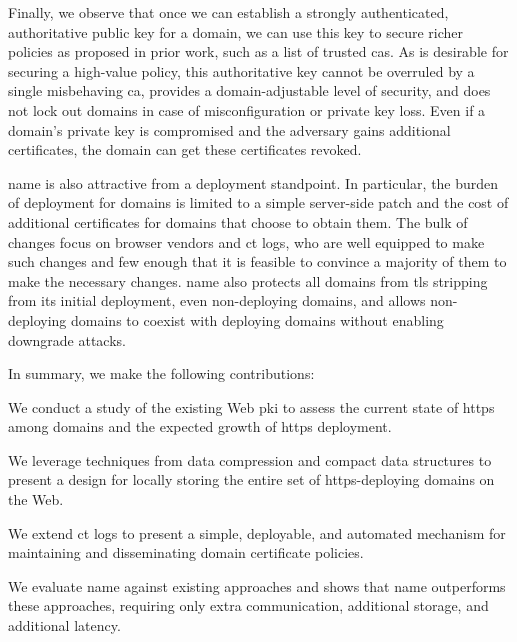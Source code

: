Finally, we observe that once we can establish a strongly authenticated,
authoritative public key for a domain, we can use this key to secure richer
policies as proposed in prior work, such as a list of trusted \acp{ca}. As is
desirable for securing a high-value policy, this authoritative key cannot be
overruled by a single misbehaving \ac{ca}, provides a domain-adjustable level of
security, and does not lock out domains in case of misconfiguration or private
key loss. Even if a domain's private key is compromised and the adversary gains
additional certificates, the domain can get these certificates revoked.

\ac{name} is also attractive from a deployment standpoint. In particular, the
burden of deployment for domains is limited to a simple server-side patch and
the cost of additional certificates for domains that choose to obtain them. The
bulk of changes focus on browser vendors and \ac{ct} logs, who are well equipped
to make such changes and few enough that it is feasible to convince a majority
of them to make the necessary changes. \ac{name} also protects all domains from
\ac{tls} stripping from its initial deployment, even non-deploying domains, and
allows non-deploying domains to coexist with deploying domains without enabling
downgrade attacks.

In summary, we make the following contributions:
\begin{compactitem}
\item We conduct a study of the existing Web \ac{pki} to assess the current
  state of \ac{https} among domains and the expected growth of \ac{https}
  deployment.
\item We leverage techniques from data compression and compact data structures
  to present a design for locally storing the entire set of \ac{https}-deploying
  domains on the Web.
\item We extend \ac{ct} logs to present a simple, deployable, and automated
  mechanism for maintaining and disseminating domain certificate policies.
\item We evaluate \ac{name} against existing approaches and shows that
  \ac{name} outperforms these approaches, requiring only \steve{} extra
  communication, \steve{} additional storage, and \steve{} additional latency.
\end{compactitem}




